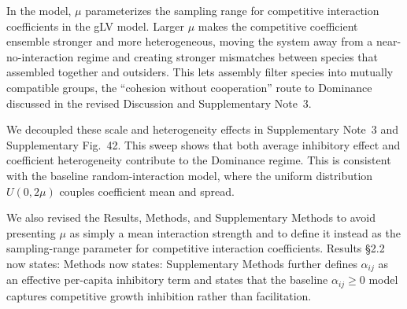 
\responselabel
In the model, $\mu$ parameterizes the sampling range for competitive interaction coefficients in the gLV model. Larger $\mu$ makes the competitive coefficient ensemble stronger and more heterogeneous, moving the system away from a near-no-interaction regime and creating stronger mismatches between species that assembled together and outsiders. This lets assembly filter species into mutually compatible groups, the ``cohesion without cooperation'' route to Dominance discussed in the revised Discussion and Supplementary Note~3.

We decoupled these scale and heterogeneity effects in Supplementary Note~3 and Supplementary Fig.~42. This sweep shows that both average inhibitory effect and coefficient heterogeneity contribute to the Dominance regime. This is consistent with the baseline random-interaction model, where the uniform distribution $U(0, 2\mu)$ couples coefficient mean and spread.

We also revised the Results, Methods, and Supplementary Methods to avoid presenting $\mu$ as simply a mean interaction strength and to define it instead as the sampling-range parameter for competitive interaction coefficients. Results \S2.2 now states:  Methods now states:  Supplementary Methods further defines $\alpha_{ij}$ as an effective per-capita inhibitory term and states that the baseline $\alpha_{ij}\geq 0$ model captures competitive growth inhibition rather than facilitation.


